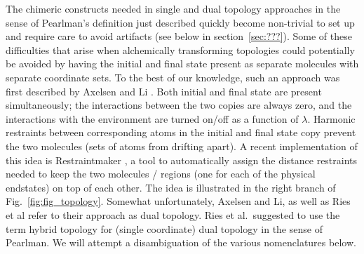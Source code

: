 \documentclass[9pt,bestpractices]{livecoms}
\newcommand{\sbnote}[1]{%
  {\bfseries{}[SB: }%
  {\textcolor{blue}{#1}}{\bfseries{}]}
}
\begin{document}
The chimeric constructs needed in single and dual topology approaches in the sense of Pearlman’s definition just described quickly become non-trivial to set up and require care to avoid artifacts (see below in section~\ref{sec:???}). %
Some of these difficulties that arise when alchemically transforming topologies could potentially be avoided by having the initial and final state present as separate molecules with separate coordinate sets. To the best of our knowledge, such an approach was first described by Axelsen and Li \cite{Axelsen_1998}. Both initial and final state are present simultaneously; the interactions between the two copies are always zero,  and the interactions with the environment are turned on/off as a function of $\lambda$. Harmonic restraints between corresponding atoms in the initial and final state copy prevent the two molecules (sets of atoms from drifting apart). %
A recent implementation of this idea is Restraintmaker \cite{Ries_2022}, a tool to automatically assign the distance restraints needed to keep the two molecules / regions (one for each of the physical endstates) on top of each other. The idea is illustrated in the right branch of Fig.~\ref{fig:fig_topology}.  Somewhat unfortunately, Axelsen and Li, as well as Ries et al refer to their approach as dual topology. Ries et al.~suggested to use the term hybrid topology for (single coordinate) dual topology in the sense of Pearlman. We will attempt a disambiguation of the various nomenclatures below.
\end{document}
